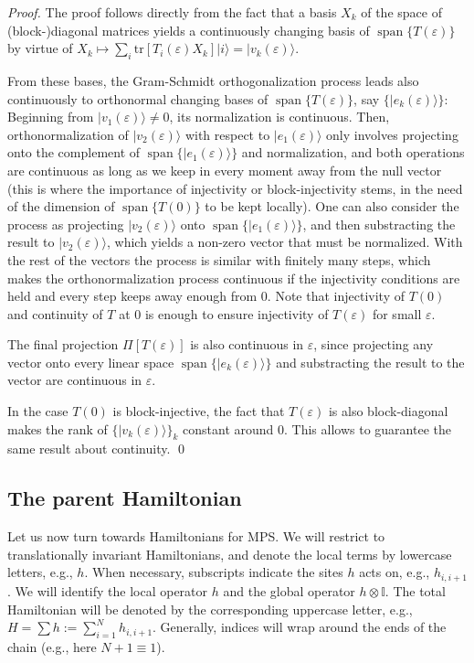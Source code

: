 \documentclass[cmp]{svjour}
\newcommand{\veps}{\varepsilon}
\newcommand{\tr}{\mathrm{tr}}
\newcommand{\I}{\mathbb{I}}
\DeclareMathOperator{\spann}{span}
\newcommand{\ket}[1]{|#1\rangle}
\begin{document}
\begin{proof}
    The proof follows directly from the fact that a basis $X_k$ of the space
    of \mbox{(block-)}dia\-gonal matrices yields a continuously changing basis of
    $\spann\{T(\veps)\}$ by virtue of $X_k\mapsto \sum_i\tr[T_i(\veps)X_k]\ket i=\ket{v_k(\veps)}$.

    From these bases, the Gram-Schmidt orthogonalization process leads also continuously to orthonormal changing bases of $\spann\{T(\veps)\}$, say $\{\ket{e_k(\veps)}\}$: Beginning from $\ket{v_1(\veps)}\ne 0$, its normalization is continuous. Then, orthonormalization of $\ket{v_2(\veps)}$ with respect to $\ket{e_1(\veps)}$ only involves projecting onto the complement of $\spann\{\ket{e_1(\veps)}\}$ and normalization, and both operations are continuous as long as we keep in every moment away from the null vector (this is where the importance of injectivity or block-injectivity stems, in the need of the dimension of $\spann\{T(0)\}$ to be kept locally). One can also consider the process as projecting $\ket{v_2(\veps)}$ onto $\spann\{\ket{e_1(\veps)}\}$, and then substracting the result to $\ket{v_2(\veps)}$, which yields a non-zero vector that must be normalized. With the rest of the vectors the process is similar with finitely many steps, which makes the orthonormalization process continuous if the injectivity conditions are held and every step keeps away enough from 0. Note that injectivity of $T(0)$ and continuity of $T$ at 0 is enough to ensure injectivity of $T(\varepsilon)$ for small $\varepsilon$.

    The final projection $\Pi[T(\veps)]$ is also continuous in $\veps$, since projecting any vector onto every linear space $\spann\{\ket{e_k(\veps)}\}$ and substracting the result to the vector are continuous in $\veps$.

    In the case $T(0)$ is block-injective, the fact that $T(\varepsilon)$ is also block-diagonal makes the rank of $\{\ket{v_k(\varepsilon)}\}_k$ constant around 0. This allows to guarantee the same result about continuity.
    \hspace*{\fill}\qed

\end{proof}


\subsection{The parent Hamiltonian}
Let us now turn towards Hamiltonians for MPS.  We will restrict to
translationally invariant Hamiltonians, and denote the local terms by
lowercase letters, e.g., $h$. When necessary, subscripts indicate the
sites $h$ acts on, e.g., $h_{i,i+1}$.  We will identify the local operator
$h$ and the global operator $h\otimes\I$.  The total Hamiltonian will be
denoted by the corresponding uppercase letter, e.g., $H=\sum
    h:=\sum_{i=1}^N h_{i,i+1}$. Generally, indices will wrap around the ends
of the chain (e.g., here $N+1\equiv 1$).
\end{document}
